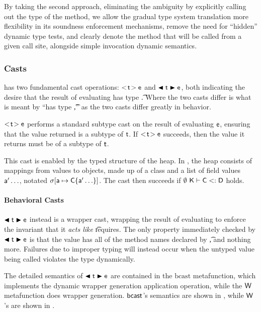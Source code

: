 \documentclass[a4paper,USenglish]{tex/lipics-v2016}
\begin{document}
By taking the second approach, eliminating the ambiguity by explicitly
calling out the type of the method, we allow the gradual type system
translation more flexibility in its soundness enforcement mechanisms,
remove the need for ``hidden'' dynamic type tests, and clearly denote
the method that will be called from a given call site, alongside 
simple invocation dynamic semantics.


\subsubsection{Casts}

\kafka has two fundamental cast operations: $\SubCast\t\e$ and $\BehCast\t\e$,
both indicating the desire that the result of evaluating \e has type \t.
Where the two casts differ is what is meant by ``has type \t,'' as the two
casts differ greatly in behavior.

$\SubCast\t\e$ performs a standard subtype cast on the result of evaluating
$\e$, ensuring that the value returned is a subtype of $\t$. If $\SubCast\t\e$
succeeds, then the value it returns must be of a subtype of $\t$.

This cast is enabled by the typed structure of the \kafka heap. In \kafka, the
heap \s consists of mappings from values \a to objects, made up of a class \C
and a list of field values $\ap\ldots$, notated $\s[\a \mapsto
\C\{\ap\ldots\}]$. The cast then succeeds if $\StrSub \emptyset\K\C\D$ holds.

\paragraph*{Behavioral Casts}

$\BehCast\t\e$ instead is a wrapper cast, wrapping the result of evaluating \e
to enforce the invariant that it \emph{acts like} \t requires. The only
property immediately checked by $\BehCast\t\e$ is that the value has all of
the method names declared by \t, and nothing more. Failures due to improper
typing will instead occur when the untyped value being called violates
the type dynamically.

The detailed semantics of $\BehCast\t\e$ are contained in the $\text{bcast}$
metafunction, which implements the dynamic wrapper generation application
operation, while the ${\sf{W}}$ metafunction does wrapper generation.
${\sf{bcast}}$'s semantics are shown in , while
${\sf{W}}$'s are shown in .
\end{document}
